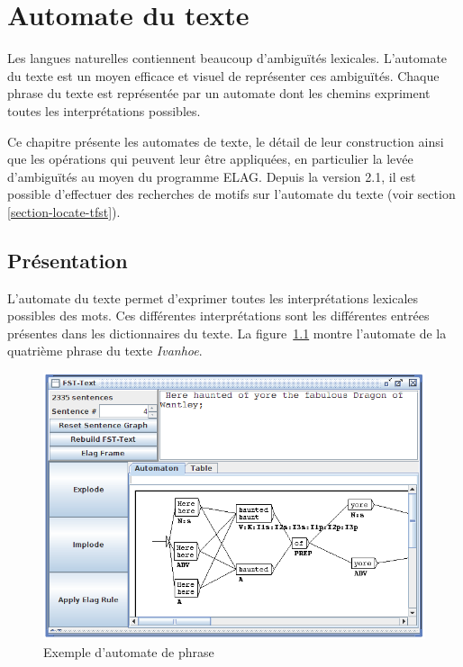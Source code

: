 \chapter{Automate du texte}
\label{chap-text-automaton}
Les langues naturelles contiennent beaucoup d’ambiguïtés lexicales. L’automate du texte
est un moyen efficace et visuel de représenter ces ambiguïtés. Chaque phrase du texte est
représentée par un automate dont les chemins expriment toutes les interprétations possibles.


\bigskip
\noindent Ce chapitre présente les automates de texte, le détail de leur construction ainsi
que les opérations qui peuvent leur être appliquées, en particulier la levée d’ambiguïtés au moyen
du programme ELAG. Depuis la version 2.1, il est possible d’effectuer des recherches de
motifs sur l’automate du texte (voir section \ref{section-locate-tfst}).


\section{Présentation} 
L’automate du texte permet d’exprimer toutes les interprétations lexicales possibles des
mots. Ces différentes interprétations sont les différentes entrées présentes dans les
dictionnaires du texte. La figure~\ref{fig-sentence-automaton} montre l’automate de la
quatrième phrase du texte \textit{Ivanhoe}.

\begin{figure}[!ht]
\begin{center}
\includegraphics[width=15.5cm]{resources/img/fig7-1.png}
\caption{Exemple d’automate de phrase\label{fig-sentence-automaton}}
\end{center}
\end{figure}

